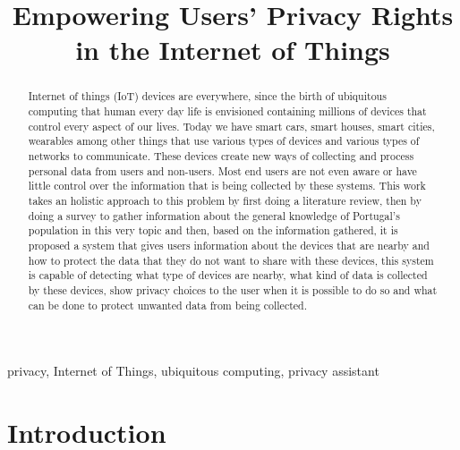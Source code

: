 \documentclass[conference]{IEEEtran}
\begin{document}
\title{Empowering Users' Privacy Rights in the Internet of Things\\
}

\author{
}

\maketitle

\begin{abstract}
Internet of things (IoT) devices are everywhere, since the birth of ubiquitous
computing that human every day life is envisioned containing millions of
devices that control every aspect of our lives. Today we have smart cars,
smart houses, smart cities, wearables among other things that use various
types of devices and various types of networks to communicate. These devices
create new ways of collecting and process personal data from users and
non-users. Most end users are not even aware or have little control over
the information that is being collected by these systems. This work takes
an holistic approach to this problem by first doing a literature review,
then by doing a survey to gather information about the general knowledge
of Portugal's population in this very topic and then, based on the information
gathered, it is proposed a system that gives users information about the
devices that are nearby and how to protect the data that they do not want
to share with these devices, this system is capable of detecting what type
of devices are nearby, what kind of data is collected by these devices,
show privacy choices to the user when it is possible to do so and what can
be done to protect unwanted data from being collected.
\end{abstract}

\begin{IEEEkeywords}
privacy, Internet of Things, ubiquitous computing, privacy assistant
\end{IEEEkeywords}

\section{Introduction}
\end{document}
